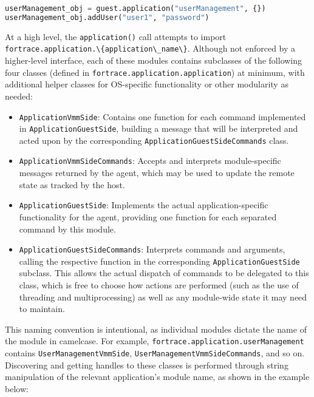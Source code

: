\documentclass[letterpaper,12pt]{report}
\def\tightlist{}
\newcommand{\passthrough}[1]{#1}
\begin{document}
\begin{lstlisting}[language=Python]
userManagement_obj = guest.application("userManagement", {})
userManagement_obj.addUser("user1", "password")
\end{lstlisting}

At a high level, the \passthrough{\lstinline!application()!} call
attempts to import
\passthrough{\lstinline!fortrace.application.\{application\_name\}!}.
Although not enforced by a higher-level interface, each of these modules
contains subclasses of the following four classes (defined in
\passthrough{\lstinline!fortrace.application.application!}) at minimum,
with additional helper classes for OS-specific functionality or other
modularity as needed:

\begin{itemize}
\tightlist
\item
  \passthrough{\lstinline!ApplicationVmmSide!}: Contains one function
  for each command implemented in
  \passthrough{\lstinline!ApplicationGuestSide!}, building a message
  that will be interpreted and acted upon by the corresponding
  \passthrough{\lstinline!ApplicationGuestSideCommands!} class.
\item
  \passthrough{\lstinline!ApplicationVmmSideCommands!}: Accepts and
  interprets module-specific messages returned by the agent, which may
  be used to update the remote state as tracked by the host.
\item
  \passthrough{\lstinline!ApplicationGuestSide!}: Implements the actual
  application-specific functionality for the agent, providing one
  function for each separated command by this module.
\item
  \passthrough{\lstinline!ApplicationGuestSideCommands!}: Interprets
  commands and arguments, calling the respective function in the
  corresponding \passthrough{\lstinline!ApplicationGuestSide!} subclass.
  This allows the actual dispatch of commands to be delegated to this
  class, which is free to choose how actions are performed (such as the
  use of threading and multiprocessing) as well as any module-wide state
  it may need to maintain.
\end{itemize}

This naming convention is intentional, as individual modules dictate the
name of the module in camelcase. For example,
\passthrough{\lstinline!fortrace.application.userManagement!} contains
\passthrough{\lstinline!UserManagementVmmSide!},
\passthrough{\lstinline!UserManagementVmmSideCommands!}, and so on.
Discovering and getting handles to these classes is performed through
string manipulation of the relevant application's module name, as shown
in the example below:
\end{document}
